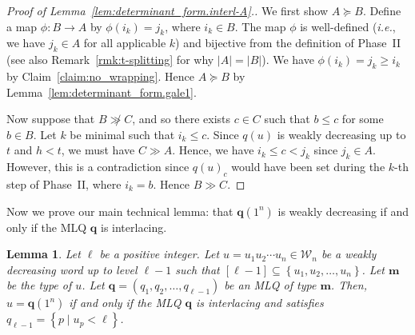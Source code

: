 \documentclass[reqno]{amsart}
\newcommand{\0}{\phantom{c}}
\newcommand{\mm}{\mathbf{m}}
\newcommand{\qq}{\mathbf{q}}
\newcommand{\mcW}{\mathcal{W}}
\newcommand{\set}[1]{\left\{ #1 \right\}}
\newcommand{\abs}[1]{\left| #1 \right|}
\newcommand{\tup}[1]{\left( #1 \right)}
\newcommand{\ive}[1]{\left[ #1 \right]}
\theoremstyle{plain}
\newtheorem{lemma}[thm]{Lemma}
\theoremstyle{definition}
\numberwithin{equation}{section}
\begin{document}
\begin{proof}[Proof of Lemma~\ref{lem:determinant_form.interl-A}.]
We first show $A \succeq B$.
Define a map $\phi \colon B \to A$ by $\phi(i_k) = j_k$, where $i_k \in B$.
The map $\phi$ is well-defined (\textit{i.e.}, we have $j_k \in A$ for all applicable $k$) and bijective from the definition of Phase~II (see also Remark~\ref{rmk:t-splitting} for why $\abs{A} = \abs{B}$).
We have $\phi(i_k) = j_k \geq i_k$ by Claim~\ref{claim:no_wrapping}.
Hence $A \succeq B$ by Lemma~\ref{lem:determinant_form.gale1}.

Now suppose that $B \not\gg C$, and so there exists $c \in C$ such that $b \leq c$ for some $b \in B$.
Let $k$ be minimal such that $i_k \leq c$.
Since $q(u)$ is weakly decreasing up to $t$ and $h < t$, we must have $C \gg A$.
Hence, we have $i_k \leq c < j_k$ since $j_k \in A$.
However, this is a contradiction since $q(u)_c$ would have been set during the $k$-th step of Phase~II, where $i_k = b$.
Hence $B \gg C$.
\end{proof}

Now we prove our main technical lemma: that $\qq(1^n)$ is weakly decreasing if and only if the MLQ $\qq$ is interlacing.

\begin{lemma}
\label{lem:determinant_form.interl-act}
Let $\ell$ be a positive integer.
Let $u = u_1 u_2 \dotsm u_n \in \mcW_n$ be a weakly decreasing word up to level $\ell-1$ such that $\ive{\ell-1} \subseteq \set{u_1, u_2, \dotsc, u_n}$.
Let $\mm$ be the type of $u$.
Let $\qq = \tup{q_1, q_2, \dotsc, q_{\ell-1}}$ be an MLQ of type $\mm$.
Then, $u = \qq(1^n)$ if and only if the MLQ $\qq$ is interlacing and satisfies $q_{\ell-1} = \set{ p \mid u_p < \ell }$.
\end{lemma}
\end{document}
